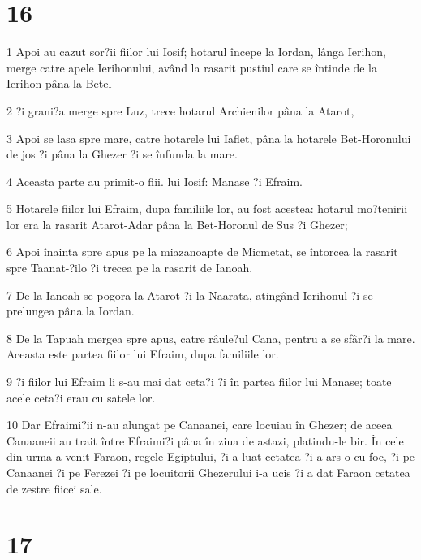 \chapter{16}

\par 1 Apoi au cazut sor?ii fiilor lui Iosif; hotarul începe la Iordan, lânga Ierihon, merge catre apele Ierihonului, având la rasarit pustiul care se întinde de la Ierihon pâna la Betel
\par 2 ?i grani?a merge spre Luz, trece hotarul Archienilor pâna la Atarot,
\par 3 Apoi se lasa spre mare, catre hotarele lui Iaflet, pâna la hotarele Bet-Horonului de jos ?i pâna la Ghezer ?i se înfunda la mare.
\par 4 Aceasta parte au primit-o fiii. lui Iosif: Manase ?i Efraim.
\par 5 Hotarele fiilor lui Efraim, dupa familiile lor, au fost acestea: hotarul mo?tenirii lor era la rasarit Atarot-Adar pâna la Bet-Horonul de Sus ?i Ghezer;
\par 6 Apoi înainta spre apus pe la miazanoapte de Micmetat, se întorcea la rasarit spre Taanat-?ilo ?i trecea pe la rasarit de Ianoah.
\par 7 De la Ianoah se pogora la Atarot ?i la Naarata, atingând Ierihonul ?i se prelungea pâna la Iordan.
\par 8 De la Tapuah mergea spre apus, catre râule?ul Cana, pentru a se sfâr?i la mare. Aceasta este partea fiilor lui Efraim, dupa familiile lor.
\par 9 ?i fiilor lui Efraim li s-au mai dat ceta?i ?i în partea fiilor lui Manase; toate acele ceta?i erau cu satele lor.
\par 10 Dar Efraimi?ii n-au alungat pe Canaanei, care locuiau în Ghezer; de aceea Canaaneii au trait între Efraimi?i pâna în ziua de astazi, platindu-le bir. În cele din urma a venit Faraon, regele Egiptului, ?i a luat cetatea ?i a ars-o cu foc, ?i pe Canaanei ?i pe Ferezei ?i pe locuitorii Ghezerului i-a ucis ?i a dat Faraon cetatea de zestre fiicei sale.

\chapter{17}

